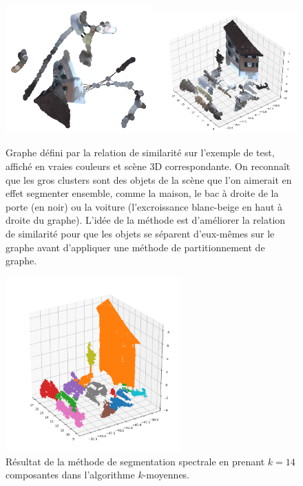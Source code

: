 \documentclass[a4paper, onecolumn, 11pt]{article}
\begin{document}
\begin{figure}[h]
    \centering
    \includegraphics[width=0.5\textwidth]{fig/nx_graph.png}\includegraphics[width=0.5\textwidth]{fig/nx_3d_realcolor.png}
    \caption{Graphe défini par la relation de similarité sur l'exemple de test, affiché en vraies couleurs et scène 3D correspondante. On reconnaît que les gros clusters sont des objets de la scène que l'on aimerait en effet segmenter ensemble, comme la maison, le bac à droite de la porte (en noir) ou la voiture (l'excroissance blanc-beige en haut à droite du graphe). L'idée de la méthode est d'améliorer la relation de similarité pour que les objets se séparent d'eux-mêmes sur le graphe avant d'appliquer une méthode de partitionnement de graphe.}
    \label{fig:network_kernel}
\end{figure}

\begin{figure}[h]
    \centering
    \includegraphics[width=0.6\textwidth]{fig/third_segmentation_spectral.png}
    \caption{Résultat de la méthode de segmentation spectrale en prenant $k = 14$ composantes dans l'algorithme $k$-moyennes.}
    \label{fig:resultat-segmentation-spectrale}
\end{figure}
\end{document}

